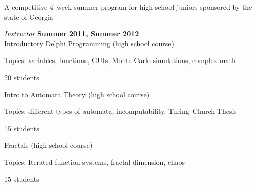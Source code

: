 \documentclass[10pt]{article}
\newenvironment{outerlist}[1][\enskip\textbullet]%
        {\begin{itemize}[#1]}{\end{itemize}%
         \vspace{-.6\baselineskip}}
\newenvironment{innerlist}[1][\enskip\textbullet]%
        {\begin{compactitem}[#1]}{\end{compactitem}}
\newcommand{\blankline}{\quad\pagebreak[2]}
\begin{document}
A competitive 4--week summer program for high school juniors sponsored by the state of Georgia
\begin{outerlist}

\item[] \textit{Instructor}%
    \hfill \textbf{Summer 2011, Summer 2012}\\
    Introductory Delphi Programming (high school course)
    \begin{innerlist}
    \item Topics: variables, functions, GUIs, Monte Carlo simulations, complex math
    \item 20 students
    \end{innerlist}

    Intro to Automata Theory (high school course)
    \begin{innerlist}
    \item Topics: different types of automata, incomputability, Turing--Church Thesis
    \item 15 students
    \end{innerlist}

    Fractals (high school course)
    \begin{innerlist}
    \item Topics: Iterated function systems, fractal dimension, chaos
    \item 15 students
    \end{innerlist}

\end{outerlist}


\end{document}
